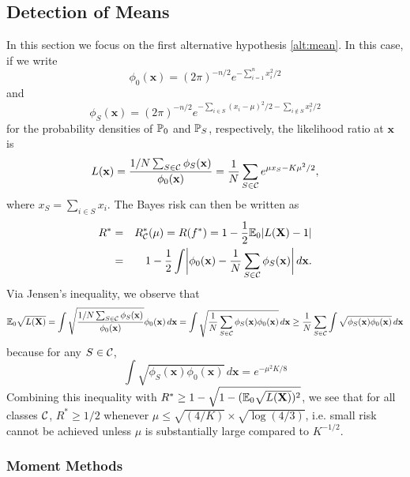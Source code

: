 \documentclass[10pt, oneside]{article}
\begin{document}
\subsection{Detection of Means}
In this section we focus on the first alternative hypothesis \ref{alt:mean}. In this case, if we write 
%
\[
\phi_0(\mathbf{x}) = (2\pi)^{-n/2} e^{-\sum_{i=1}^n x_i^2/2}
\]
%
and
%
\[
\phi_S(\mathbf{x}) = (2\pi)^{-n/2} e^{-\sum_{i\in S}(x_i-\mu
)^2/2-\sum
_{i\notin S} x_i^2/2}
\]
for the
probability densities of $\mathbb{P}_0$ and $\mathbb{P}_S$, respectively,
the likelihood ratio at $\mathbf{x}$ is
\[
L(\mathbf{x})
= \frac{{1/N}\sum_{S\in{\mathcal C}} \phi_S(\mathbf{x})}{\phi
_0(\mathbf{x})}
= \frac{1}{N} \sum_{S\in{\mathcal C}}
e^{\mu x_S - K\mu^2/2},
\]
where $x_S = \sum_{i\in S} x_i$.
The Bayes risk can then be written
as
\begin{eqnarray*}
R^* & = & R^*_{{\mathcal C}}(\mu) = R(f^*) = 1 - \frac{1}{2} \mathbb{E}_0 |L(\mathbf{X}
)-1| \\
& = & 1 - \frac{1}{2}
\int\biggl| \phi_0(\mathbf{x}) -\frac{1}{N}\sum_{S\in{\mathcal C}} \phi
_S(\mathbf{x}) \biggr|\, d\mathbf{x}.
\end{eqnarray*}
Via Jensen's inequality, we observe that 
\[
\mathbb{E}_0 \sqrt{L(\mathbf{X})} = \int\sqrt{\frac{{1/N}\sum_{S\in{\mathcal C}} \phi_S(\mathbf{x})}{\phi
_0(\mathbf{x})}} \phi
_0(\mathbf{x}) \,d\mathbf{x}
= \int\sqrt{\frac{1}{N} \sum_{S\in{\mathcal C}} \phi_S(\mathbf{x}) \phi
_0(\mathbf{x})} \,d\mathbf{x}
\ge\frac{1}{N} \sum_{S\in{\mathcal C}}
\int\sqrt{ \phi_S(\mathbf{x}) \phi_0(\mathbf{x})} \,d\mathbf{x}
\] 
because for any $S\in{\mathcal C}$,
\[
\int\sqrt{ \phi_S(\mathbf{x}) \phi_0(\mathbf{x})} \,d\mathbf
{x}=e^{-\mu^2K/8}
\]
Combining this inequality with $R^* \ge 1 - \sqrt{1 - (\mathbb{E}_0 \sqrt{L(\mathbf{X})})^2}$, we see that for all classes ${\mathcal C}$, $R^* \ge1/2$ whenever
$\mu\le\sqrt{(4/K)}\times\sqrt{\log(4/3)}$, i.e. small risk cannot
be achieved unless $\mu$ is substantially large compared to $K^{-1/2}$.

%
\subsubsection{Moment Methods}
\label{subsubsec:Moment Methods}
%
\end{document}
